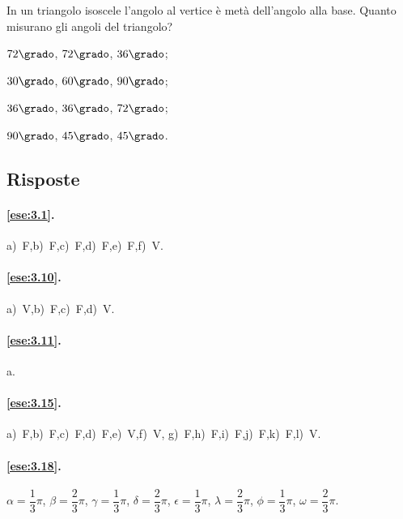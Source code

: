 \pagebreak

\begin{esercizio}
\label{ese:3.117}
In un triangolo isoscele l'angolo al vertice è metà dell'angolo alla 
base. Quanto misurano gli angoli del triangolo?
\begin{multicols}{4}
\begin{enumeratea}
\item $72\grado$, $72\grado$, $36\grado$;
\item $30\grado$, $60\grado$, $90\grado$;
\item $36\grado$, $36\grado$, $72\grado$;
\item $90\grado$, $45\grado$, $45\grado$.
\end{enumeratea}
\end{multicols}
\end{esercizio}


\subsection{Risposte}

\begingroup
\hypersetup{linkcolor=black}

\paragraph{\ref{ese:3.1}.}
a)~F,\quad b)~F,\quad c)~F,\quad d)~F,\quad e)~F,\quad f)~V.

\paragraph{\ref{ese:3.10}.}
a)~V,\quad b)~F,\quad c)~F,\quad d)~V.

\paragraph{\ref{ese:3.11}.}
a.

\paragraph{\ref{ese:3.15}.}
a)~F,\quad b)~F,\quad c)~F,\quad d)~F,\quad e)~V,\quad f)~V,\quad 
g)~F,\quad h)~F,\quad i)~F,\quad j)~F,\quad k)~F,\quad l)~V.

\paragraph{\ref{ese:3.18}.}
$\alpha=\dfrac{1}{3}\pi$, $\beta=\dfrac{2}{3}\pi$, 
$\gamma=\dfrac{1}{3}\pi$, $\delta=\dfrac{2}{3}\pi$, 
$\epsilon=\dfrac{1}{3}\pi$, $\lambda=\dfrac{2}{3}\pi$, 
$\phi=\dfrac{1}{3}\pi$, $\omega=\dfrac{2}{3}\pi$.

